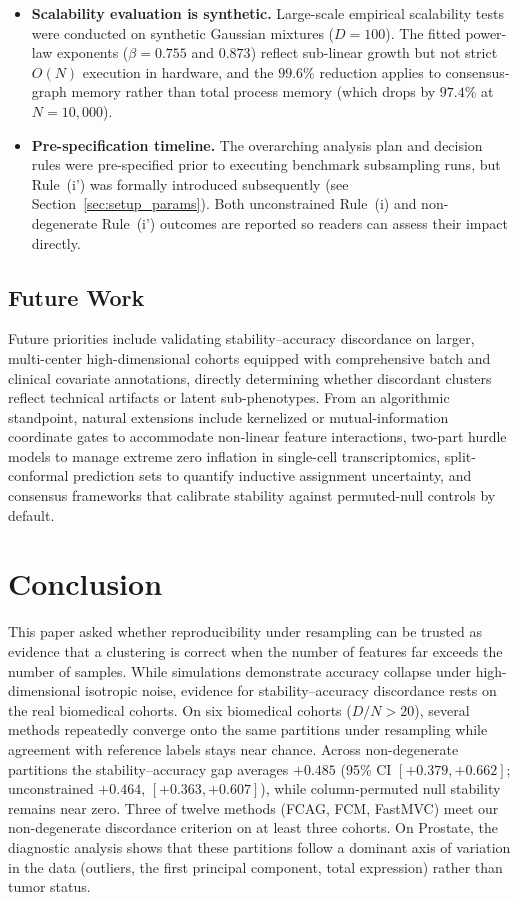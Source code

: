 \documentclass[pdflatex,sn-mathphys-num]{sn-jnl}
\theoremstyle{thmstyleone}
\theoremstyle{thmstyletwo}
\theoremstyle{thmstylethree}
\begin{document}
\begin{itemize}
    \item \textbf{Scalability evaluation is synthetic.} Large-scale empirical scalability tests were conducted on synthetic Gaussian mixtures ($D = 100$). The fitted power-law exponents ($\beta = 0.755$ and $0.873$) reflect sub-linear growth but not strict $O(N)$ execution in hardware, and the $99.6\%$ reduction applies to consensus-graph memory rather than total process memory (which drops by $97.4\%$ at $N = 10{,}000$).
    \item \textbf{Pre-specification timeline.} The overarching analysis plan and decision rules were pre-specified prior to executing benchmark subsampling runs, but Rule~(i') was formally introduced subsequently (see Section~\ref{sec:setup_params}). Both unconstrained Rule~(i) and non-degenerate Rule~(i') outcomes are reported so readers can assess their impact directly.
\end{itemize}

\subsection{Future Work}\label{sec:disc_future}\label{sec:limits_future}
Future priorities include validating stability--accuracy discordance on larger, multi-center high-dimensional cohorts equipped with comprehensive batch and clinical covariate annotations, directly determining whether discordant clusters reflect technical artifacts or latent sub-phenotypes. From an algorithmic standpoint, natural extensions include kernelized or mutual-information coordinate gates to accommodate non-linear feature interactions, two-part hurdle models to manage extreme zero inflation in single-cell transcriptomics, split-conformal prediction sets to quantify inductive assignment uncertainty, and consensus frameworks that calibrate stability against permuted-null controls by default.

\section{Conclusion}\label{sec:conclusion}

This paper asked whether reproducibility under resampling can be trusted as evidence that a clustering is correct when the number of features far exceeds the number of samples. While simulations demonstrate accuracy collapse under high-dimensional isotropic noise, evidence for stability--accuracy discordance rests on the real biomedical cohorts. On six biomedical cohorts ($D/N > 20$), several methods repeatedly converge onto the same partitions under resampling while agreement with reference labels stays near chance. Across non-degenerate partitions the stability--accuracy gap averages $+0.485$ (95\% CI $[+0.379, +0.662]$; unconstrained $+0.464$, $[+0.363, +0.607]$), while column-permuted null stability remains near zero. Three of twelve methods (FCAG, FCM, FastMVC) meet our non-degenerate discordance criterion on at least three cohorts. On Prostate, the diagnostic analysis shows that these partitions follow a dominant axis of variation in the data (outliers, the first principal component, total expression) rather than tumor status.
\end{document}
